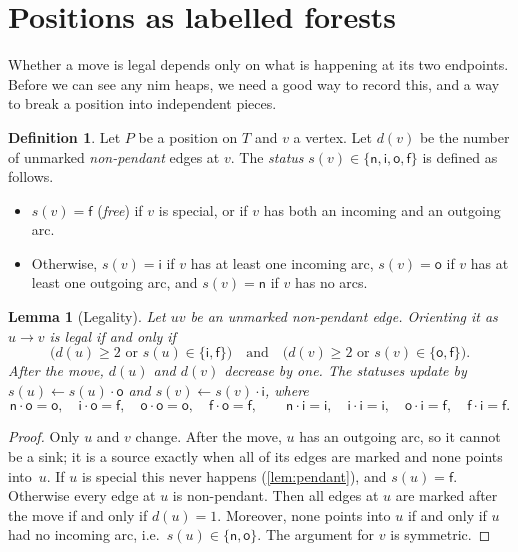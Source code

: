 \documentclass[11pt]{amsart}
\newtheorem{lemma}[theorem]{Lemma}
\theoremstyle{definition}
\newtheorem{definition}[theorem]{Definition}
\theoremstyle{remark}
\newcommand{\sn}{\mathsf{n}}
\newcommand{\si}{\mathsf{i}}
\newcommand{\so}{\mathsf{o}}
\newcommand{\sff}{\mathsf{f}}
\begin{document}
\section{Positions as labelled forests}\label{sec:forest}

Whether a move is legal depends only on what is happening at its two endpoints. Before we can see any nim heaps, we need a good way to record this, and a way to break a position into independent pieces.

\begin{definition}\label{def:status}
Let $P$ be a position on $T$ and $v$ a vertex. Let $d(v)$ be the number of unmarked \emph{non-pendant} edges at $v$. The \emph{status} $s(v)\in\{\sn,\si,\so,\sff\}$ is defined as follows.
\begin{itemize}[leftmargin=*]
\item $s(v)=\sff$ (\emph{free}) if $v$ is special, or if $v$ has both an incoming and an outgoing arc.
\item Otherwise, $s(v)=\si$ if $v$ has at least one incoming arc, $s(v)=\so$ if $v$ has at least one outgoing arc, and $s(v)=\sn$ if $v$ has no arcs.
\end{itemize}
\end{definition}

\begin{lemma}[Legality]\label{lem:legal}
Let $uv$ be an unmarked non-pendant edge. Orienting it as $u\to v$ is legal if and only if
\[
  \bigl(d(u)\ge 2 \text{ or } s(u)\in\{\si,\sff\}\bigr)\quad\text{and}\quad\bigl(d(v)\ge 2\text{ or } s(v)\in\{\so,\sff\}\bigr).
\]
After the move, $d(u)$ and $d(v)$ decrease by one. The statuses update by $s(u)\gets s(u)\cdot\so$ and $s(v)\gets s(v)\cdot\si$, where
\[
\sn\cdot\so=\so,\quad \si\cdot\so=\sff,\quad \so\cdot\so=\so,\quad \sff\cdot\so=\sff,\qquad
\sn\cdot\si=\si,\quad \si\cdot\si=\si,\quad \so\cdot\si=\sff,\quad \sff\cdot\si=\sff.
\]
\end{lemma}

\begin{proof}
Only $u$ and $v$ change. After the move, $u$ has an outgoing arc, so it cannot be a sink; it is a source exactly when all of its edges are marked and none points into~$u$. If $u$ is special this never happens (\cref{lem:pendant}), and $s(u)=\sff$. Otherwise every edge at $u$ is non-pendant. Then all edges at $u$ are marked after the move if and only if $d(u)=1$. Moreover, none points into $u$ if and only if $u$ had no incoming arc, i.e.\ $s(u)\in\{\sn,\so\}$. The argument for $v$ is symmetric.
\end{proof}
\end{document}
